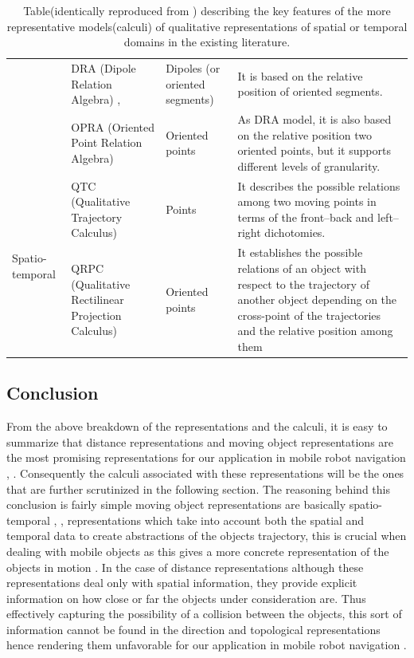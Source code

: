 \begin{table}[h!]
\begin{adjustwidth}{-2cm}{}
{\begin{tabular}{|p{3cm}|p{4cm}|p{3cm}|p{8cm}|}
						& DRA (Dipole Relation Algebra)  \cite{dylla2004empirical}, \cite{dylla2004exploiting} & Dipoles (or oriented segments) & It is based on the relative position of oriented segments. \\ \cline{2-4} 
						& OPRA (Oriented Point Relation Algebra)  \cite{dylla2006generalizing} & Oriented points & As DRA model, it is also based on the relative position two oriented points, but it supports different levels of granularity. \\ \hline
						\multirow{2}{*}{Spatio-temporal} & QTC (Qualitative Trajectory Calculus)  \cite{van2005representing} & Points & It describes the possible relations among two moving points in terms of the front–back and left–right dichotomies. \\ \cline{2-4} 
						& QRPC (Qualitative Rectilinear Projection Calculus)  \cite{glez2013qrpc} & Oriented points & It establishes the possible relations of an object with respect to the trajectory of another object depending on the cross-point of the trajectories and the relative position among them \\ \hline
				\end{tabular}}
			\caption{Table(identically reproduced from \cite{glez2013qrpc}) describing the key features of the more representative models(calculi) of qualitative representations of spatial or temporal domains in the existing literature.}
			\end{adjustwidth}
		\end{table}
	
			\newpage
	
		\subsection{Conclusion}From the above breakdown of the representations and the calculi, it is easy to summarize that distance representations and moving object representations are the most promising representations for our application in mobile robot navigation \cite{chen2015survey}, \cite{cohn1997qualitative}. Consequently the calculi associated with these representations will be the ones that are further scrutinized in the following section. The reasoning behind this conclusion is fairly simple moving object representations are basically spatio-temporal \cite{cohn2001qualitative}, \cite{cohn2008qualitative}, \cite{Yan2012QualitativeRA} representations which take into account both the spatial and temporal data to create abstractions of the objects trajectory, this is crucial when dealing with mobile objects as this gives a more concrete representation of the objects in motion \cite{glez2013qrpc}. In the case of distance representations although these representations deal only with spatial information, they provide explicit information on how close or far the objects under consideration are. Thus effectively capturing the possibility of a collision between the objects, this sort of information cannot be found in the direction and topological representations hence rendering them unfavorable for our application in mobile robot navigation  .
	

